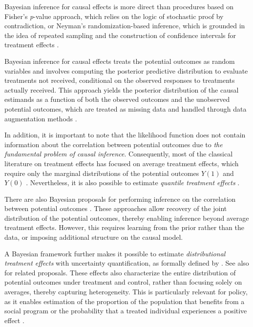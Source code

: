 Bayesian inference for causal effects \cite{rubin1978bayesian} is more direct than procedures based on Fisher's \textit{p}-value approach, which relies on the logic of stochastic proof by contradiction, or Neyman's randomization-based inference, which is grounded in the idea of repeated sampling and the construction of confidence intervals for treatment effects \cite{rubin2004teaching}.

Bayesian inference for causal effects treats the potential outcomes as random variables and involves computing the posterior predictive distribution to evaluate treatments not received, conditional on the observed responses to treatments actually received. This approach yields the posterior distribution of the causal estimands as a function of both the observed outcomes and the unobserved potential outcomes, which are treated as missing data and handled through data augmentation methods \cite{Tanner1987}. 

In addition, it is important to note that the likelihood function does not contain information about the correlation between potential outcomes due to \textit{the fundamental problem of causal inference}. Consequently, most of the classical literature on treatment effects has focused on average treatment effects, which require only the marginal distributions of the potential outcomes $Y(1)$ and $Y(0)$ \cite{heckman2014treatment}. Nevertheless, it is also possible to estimate \textit{quantile treatment effects} \cite{AbadieAngristImbens2002,Chernozhukov2005}.  

There are also Bayesian proposals for performing inference on the correlation between potential outcomes \cite{koop1997learning,heckman2014treatment}. These approaches allow recovery of the joint distribution of the potential outcomes, thereby enabling inference beyond average treatment effects. However, this requires learning from the prior rather than the data, or imposing additional structure on the causal model.  

A Bayesian framework further makes it possible to estimate \textit{distributional treatment effects} with uncertainty quantification, as formally defined by \cite{aakvik2005estimating}. See also \cite{heckman2014treatment} for related proposals. These effects also characterize the entire distribution of potential outcomes under treatment and control, rather than focusing solely on averages, thereby capturing heterogeneity. This is particularly relevant for policy, as it enables estimation of the proportion of the population that benefits from a social program or the probability that a treated individual experiences a positive effect \cite{heckman2014treatment,Ramirez2019a}.

